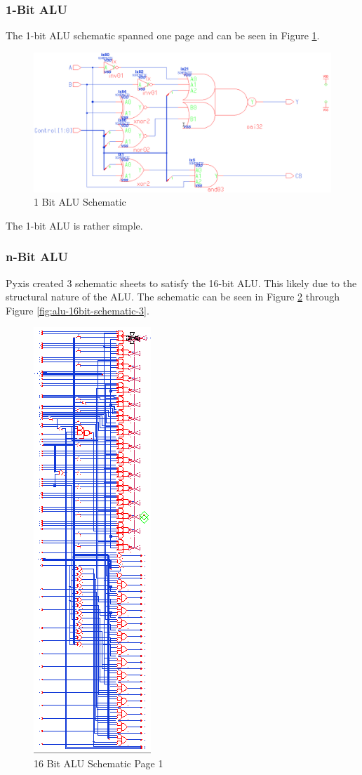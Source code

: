 \documentclass[11pt]{article}
\begin{document}
		\subsubsection{1-Bit ALU}	
		
			The 1-bit ALU schematic spanned one page and can be seen in Figure \ref{fig:alu-1bit-schematic}. 
			
			\begin{figure}[H]
				\centering
				\includegraphics[width=0.4\linewidth]{"Pictures/ALU-1Bit Schematic"}
				\caption{1 Bit ALU Schematic}
				\label{fig:alu-1bit-schematic}
			\end{figure}
		
			The 1-bit ALU is rather simple.		

		\subsubsection{n-Bit ALU}
		
			Pyxis created 3 schematic sheets to satisfy the 16-bit ALU. This likely due to the structural nature of the ALU. The schematic can be seen in Figure \ref{fig:alu-16bit-schematic-1} through Figure \ref{fig:alu-16bit-schematic-3}.
			
			
			\begin{figure}[H]
				\centering
				\includegraphics[width=0.3\linewidth]{"Pictures/ALU-16Bit Schematic 1"}
				\caption{16 Bit ALU Schematic Page 1}
				\label{fig:alu-16bit-schematic-1}
			\end{figure}
		
\end{document}
